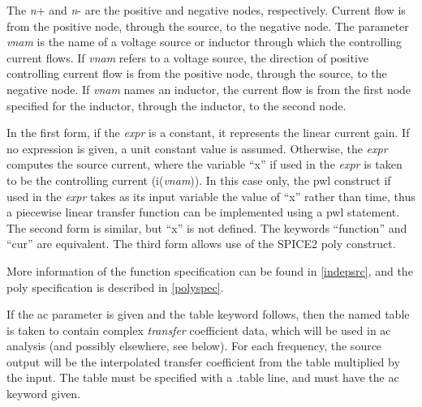 
The {\it n\/}{\vt +} and {\it n\/}{\vt -} are the positive and
negative nodes, respectively.  Current flow is from the positive node,
through the source, to the negative node.  The parameter {\it vnam\/}
is the name of a voltage source or inductor through which the
controlling current flows.  If {\it vnam} refers to a voltage source,
the direction of positive controlling current flow is from the
positive node, through the source, to the negative node.  If {\it
vnam} names an inductor, the current flow is from the first node
specified for the inductor, through the inductor, to the second node. 

In the first form, if the {\it expr} is a constant, it represents the
linear current gain.  If no expression is given, a unit constant
value is assumed.  Otherwise, the {\it expr} computes the source
current, where the variable ``{\vt x}'' if used in the {\it expr} is
taken to be the controlling current (i({\it vnam\/})).  In this case
only, the {\vt pwl} construct if used in the {\it expr} takes as its
input variable the value of ``{\vt x}'' rather than time, thus a
piecewise linear transfer function can be implemented using a {\vt
pwl} statement.  The second form is similar, but ``{\vt x}'' is not
defined.  The keywords ``{\vt function}'' and ``{\vt cur}'' are
equivalent.  The third form allows use of the SPICE2 {\vt poly}
construct.

More information of the function specification can be found in
\ref{indepsrc}, and the {\vt poly} specification is described in
\ref{polyspec}.

If the {\vt ac} parameter is given and the {\vt table} keyword
follows, then the named table is taken to contain complex {\it
transfer} coefficient data, which will be used in ac analysis (and
possibly elsewhere, see below).  For each frequency, the source output
will be the interpolated transfer coefficient from the table
multiplied by the input.  The table must be specified with a {\vt
.table} line, and must have the {\vt ac} keyword given.

